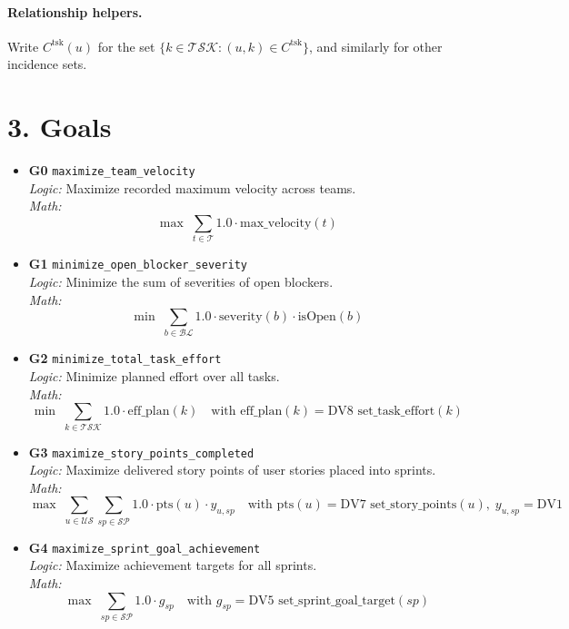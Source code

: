 \documentclass[11pt,a4paper]{article}
\begin{document}
\paragraph{Relationship helpers.}
Write $C^{\mathrm{tsk}}(u)$ for the set $\{k\in\mathcal{TSK}:(u,k)\in C^{\mathrm{tsk}}\}$, and similarly for other incidence sets.

\section{3. Goals}
\begin{itemize}[leftmargin=2em]

  \item \textbf{G0} \texttt{maximize\_team\_velocity} \\
  \emph{Logic:} Maximize recorded maximum velocity across teams. \\
  \emph{Math:}
  \[
    \max \; \sum_{t\in\mathcal{T}} 1.0\cdot \mathrm{max\_velocity}(t)
  \]

  \item \textbf{G1} \texttt{minimize\_open\_blocker\_severity} \\
  \emph{Logic:} Minimize the sum of severities of open blockers. \\
  \emph{Math:}
  \[
    \min \; \sum_{b\in\mathcal{BL}} 1.0\cdot \mathrm{severity}(b)\cdot \mathrm{isOpen}(b)
  \]

  \item \textbf{G2} \texttt{minimize\_total\_task\_effort} \\
  \emph{Logic:} Minimize planned effort over all tasks. \\
  \emph{Math:}
  \[
    \min \; \sum_{k\in\mathcal{TSK}} 1.0\cdot \mathrm{eff\_plan}(k)
    \quad\text{with }\mathrm{eff\_plan}(k)=\text{DV8 } \mathrm{set\_task\_effort}(k)
  \]

  \item \textbf{G3} \texttt{maximize\_story\_points\_completed} \\
  \emph{Logic:} Maximize delivered story points of user stories placed into sprints. \\
  \emph{Math:}
  \[
    \max \; \sum_{u\in\mathcal{US}}\sum_{sp\in\mathcal{SP}} 1.0\cdot \mathrm{pts}(u)\cdot y_{u,sp}
    \quad\text{with }\mathrm{pts}(u)=\text{DV7 } \mathrm{set\_story\_points}(u),\; y_{u,sp}=\text{DV1 }
  \]

  \item \textbf{G4} \texttt{maximize\_sprint\_goal\_achievement} \\
  \emph{Logic:} Maximize achievement targets for all sprints. \\
  \emph{Math:}
  \[
    \max \; \sum_{sp\in\mathcal{SP}} 1.0\cdot g_{sp}
    \quad\text{with } g_{sp}=\text{DV5 } \mathrm{set\_sprint\_goal\_target}(sp)
  \]


\end{itemize}
\end{document}

